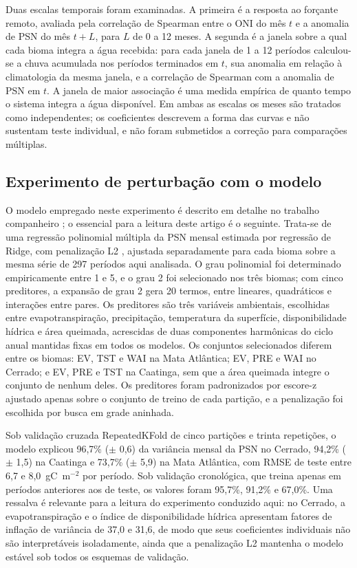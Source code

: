 \documentclass[a4paper,fleqn]{cas-sc}
\begin{document}
Duas escalas temporais foram examinadas. A primeira é a resposta ao forçante remoto, avaliada pela correlação de Spearman entre o ONI do mês $t$ e a anomalia de PSN do mês $t+L$, para $L$ de 0 a 12 meses. A segunda é a janela sobre a qual cada bioma integra a água recebida: para cada janela de 1 a 12 períodos calculou-se a chuva acumulada nos períodos terminados em $t$, sua anomalia em relação à climatologia da mesma janela, e a correlação de Spearman com a anomalia de PSN em $t$. A janela de maior associação é uma medida empírica de quanto tempo o sistema integra a água disponível. Em ambas as escalas os meses são tratados como independentes; os coeficientes descrevem a forma das curvas e não sustentam teste individual, e não foram submetidos a correção para comparações múltiplas.

\subsection{Experimento de perturbação com o modelo}

O modelo empregado neste experimento é descrito em detalhe no trabalho companheiro \citep{oliveira2026}; o essencial para a leitura deste artigo é o seguinte. Trata-se de uma regressão polinomial múltipla da PSN mensal estimada por regressão de Ridge, com penalização L2 \citep{hoerl1970}, ajustada separadamente para cada bioma sobre a mesma série de 297 períodos aqui analisada. O grau polinomial foi determinado empiricamente entre 1 e 5, e o grau 2 foi selecionado nos três biomas; com cinco preditores, a expansão de grau 2 gera 20 termos, entre lineares, quadráticos e interações entre pares. Os preditores são três variáveis ambientais, escolhidas entre evapotranspiração, precipitação, temperatura da superfície, disponibilidade hídrica e área queimada, acrescidas de duas componentes harmônicas do ciclo anual mantidas fixas em todos os modelos. Os conjuntos selecionados diferem entre os biomas: EV, TST e WAI na Mata Atlântica; EV, PRE e WAI no Cerrado; e EV, PRE e TST na Caatinga, sem que a área queimada integre o conjunto de nenhum deles. Os preditores foram padronizados por escore-z ajustado apenas sobre o conjunto de treino de cada partição, e a penalização foi escolhida por busca em grade aninhada.

Sob validação cruzada RepeatedKFold de cinco partições e trinta repetições, o modelo explicou 96,7\% ($\pm$ 0,6) da variância mensal da PSN no Cerrado, 94,2\% ($\pm$ 1,5) na Caatinga e 73,7\% ($\pm$ 5,9) na Mata Atlântica, com RMSE de teste entre 6,7 e 8,0~gC~m$^{-2}$ por período. Sob validação cronológica, que treina apenas em períodos anteriores aos de teste, os valores foram 95,7\%, 91,2\% e 67,0\%. Uma ressalva é relevante para a leitura do experimento conduzido aqui: no Cerrado, a evapotranspiração e o índice de disponibilidade hídrica apresentam fatores de inflação de variância de 37,0 e 31,6, de modo que seus coeficientes individuais não são interpretáveis isoladamente, ainda que a penalização L2 mantenha o modelo estável sob todos os esquemas de validação.
\end{document}
